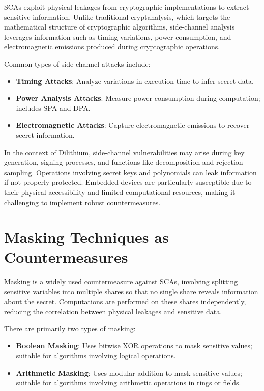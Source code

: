 \acp{SCA} exploit physical leakages from cryptographic implementations to extract sensitive information. Unlike traditional cryptanalysis, which targets the mathematical structure of cryptographic algorithms, side-channel analysis leverages information such as timing variations, power consumption, and electromagnetic emissions produced during cryptographic operations.

Common types of side-channel attacks include:

\begin{itemize}
    \item \textbf{Timing Attacks}: Analyze variations in execution time to infer secret data.
    \item \textbf{Power Analysis Attacks}: Measure power consumption during computation; includes \ac{SPA} and \ac{DPA}.
    \item \textbf{Electromagnetic Attacks}: Capture electromagnetic emissions to recover secret information.
\end{itemize}

In the context of Dilithium, side-channel vulnerabilities may arise during key generation, signing processes, and functions like decomposition and rejection sampling. Operations involving secret keys and polynomials can leak information if not properly protected. Embedded devices are particularly susceptible due to their physical accessibility and limited computational resources, making it challenging to implement robust countermeasures.

\section{Masking Techniques as Countermeasures}

Masking is a widely used countermeasure against \acp{SCA}, involving splitting sensitive variables into multiple shares so that no single share reveals information about the secret. Computations are performed on these shares independently, reducing the correlation between physical leakages and sensitive data.

There are primarily two types of masking:

\begin{itemize}
    \item \textbf{Boolean Masking}: Uses bitwise XOR operations to mask sensitive values; suitable for algorithms involving logical operations.
    \item \textbf{Arithmetic Masking}: Uses modular addition to mask sensitive values; suitable for algorithms involving arithmetic operations in rings or fields.
\end{itemize}

